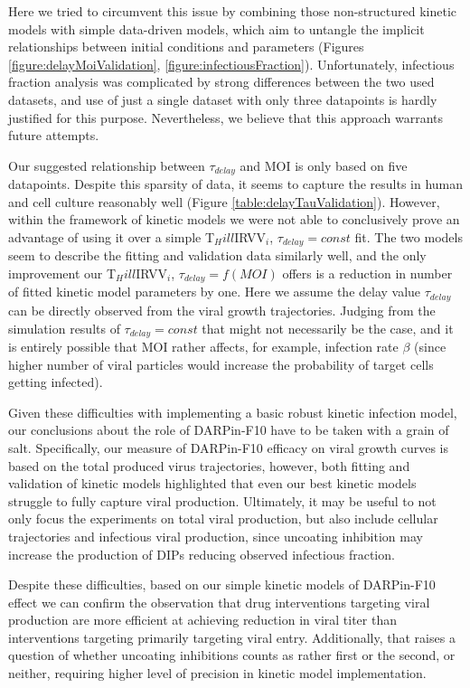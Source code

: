 Here we tried to circumvent this issue by combining those non-structured kinetic models with simple data-driven models, which aim to untangle the implicit relationships between initial conditions and parameters (Figures \ref{figure:delayMoiValidation}, \ref{figure:infectiousFraction}). Unfortunately, infectious fraction analysis was complicated by strong differences between the two used datasets, and use of just a single dataset with only three datapoints is hardly justified for this purpose. Nevertheless, we believe that this approach warrants future attempts.

Our suggested relationship between $\tau_{delay}$ and MOI is  only based on five datapoints. Despite this sparsity of data, it seems to capture the results in human and cell culture reasonably well (Figure \ref{table:delayTauValidation}). However, within the framework of kinetic models we were not able to conclusively prove an advantage of using it over a simple T$_Hill$IRVV$_i$, $\tau_{delay} = const$ fit. The two models seem to describe the fitting and validation data similarly well, and the only improvement our T$_Hill$IRVV$_i$, $\tau_{delay} = f(MOI)$ offers is a reduction in number of fitted kinetic model parameters by one. Here we assume the delay value $\tau_{delay}$ can be directly observed from the viral growth trajectories. Judging from the simulation results of $\tau_{delay} = const$ that might not necessarily be the case, and it is entirely possible that MOI rather affects, for example, infection rate $\beta$ (since higher number of viral particles would increase the probability of target cells getting infected). 

Given these difficulties with implementing a basic robust kinetic infection model, our conclusions about the role of DARPin-F10 have to be taken with a grain of salt. Specifically, our measure of DARPin-F10 efficacy on viral growth curves is based on the total produced virus trajectories, however, both fitting and validation of kinetic models highlighted that even our best kinetic models struggle to fully capture viral production. Ultimately, it may be useful to not only focus the experiments on total viral production, but also include cellular trajectories and infectious viral production, since uncoating inhibition may increase the production of DIPs reducing observed infectious fraction.

Despite these difficulties, based on our simple kinetic models of DARPin-F10 effect we can confirm the observation \cite{heldt2013multiscale} that drug interventions targeting viral production are more efficient at achieving reduction in viral titer than interventions targeting primarily targeting viral entry. Additionally, that raises a question of whether uncoating inhibitions counts as rather first or the second, or neither, requiring higher level of precision in kinetic model implementation.